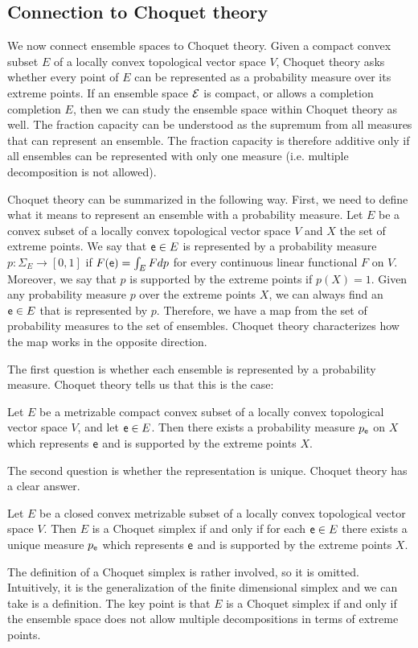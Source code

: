\subsection{Connection to Choquet theory}

We now connect ensemble spaces to Choquet theory. Given a compact convex subset $E$ of a locally convex topological vector space $V$, Choquet theory asks whether every point of $E$ can be represented as a probability measure over its extreme points. If an ensemble space $\mathcal{E}$ is compact, or allows a completion completion $E$, then we can study the ensemble space within Choquet theory as well. The fraction capacity can be understood as the supremum from all measures that can represent an ensemble. The fraction capacity is therefore additive only if all ensembles can be represented with only one measure (i.e. multiple decomposition is not allowed).

Choquet theory can be summarized in the following way. First, we need to define what it means to represent an ensemble with a probability measure. Let $E$ be a convex subset of a locally convex topological vector space $V$ and $X$ the set of extreme points. We say that $\mathsf{e} \in E$ is represented by a probability measure $p : \Sigma_{E} \to [0,1]$ if $F(\mathsf{e}) = \int_E F dp$ for every continuous linear functional $F$ on $V$. Moreover, we say that $p$ is supported by the extreme points if $p(X) = 1$. Given any probability measure $p$ over the extreme points $X$, we can always find an $\mathsf{e} \in E$ that is represented by $p$. Therefore, we have a map from the set of probability measures to the set of ensembles. Choquet theory characterizes how the map works in the opposite direction.

The first question is whether each ensemble is represented by a probability measure. Choquet theory tells us that this is the case:
\begin{thrm}[Choquet 1]
	Let $E$ be a metrizable compact convex subset of a locally convex topological vector space $V$, and let $\mathsf{e} \in E$. Then there exists a probability measure $p_{\mathsf{e}}$ on $X$ which represents $\mathsf{e}$ and is supported by the extreme points $X$.
\end{thrm}
The second question is whether the representation is unique. Choquet theory has a clear answer.
\begin{thrm}[Choquet 2]
	Let $E$ be a closed convex metrizable subset of a locally convex topological vector space $V$. Then $E$ is a Choquet simplex if and only if for each $\mathsf{e} \in E$ there exists a unique measure $p_{\mathsf{e}}$ which represents $\mathsf{e}$ and is supported by the extreme points $X$.
\end{thrm}
The definition of a Choquet simplex is rather involved, so it is omitted. Intuitively, it is the generalization of the finite dimensional simplex and we can take is a definition. The key point is that $E$ is a Choquet simplex if and only if the ensemble space does not allow multiple decompositions in terms of extreme points.

